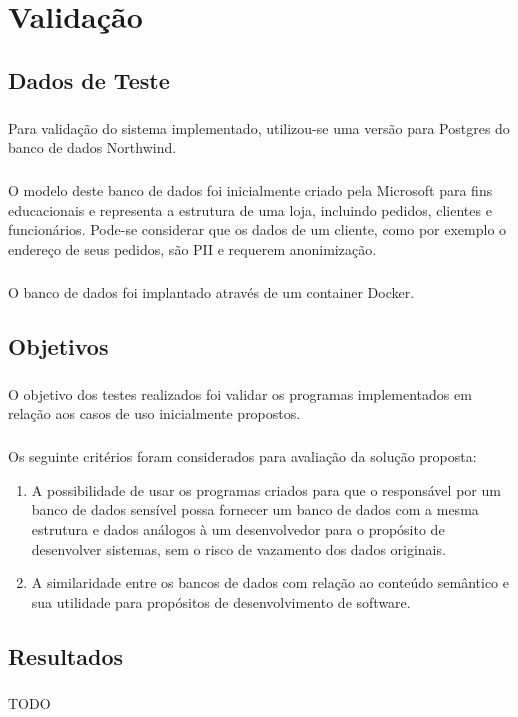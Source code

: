 \chapter{Validação}
\label{cap5}

\section{Dados de Teste}

\paragraph{} Para validação do sistema implementado, utilizou-se uma versão para Postgres do banco de dados Northwind\cite{northwindpg}.

\paragraph{} O modelo deste banco de dados foi inicialmente criado pela Microsoft para fins educacionais e representa a estrutura de uma loja, incluindo pedidos, clientes e funcionários. Pode-se considerar que os dados de um cliente, como por exemplo o endereço de seus pedidos, são PII e requerem anonimização.

\paragraph{} O banco de dados foi implantado através de um container Docker.

\section{Objetivos}

\paragraph{} O objetivo dos testes realizados foi validar os programas implementados em relação aos casos de uso inicialmente propostos.

\paragraph{} Os seguinte critérios foram considerados para avaliação da solução proposta:

\begin{enumerate}
    \item A possibilidade de usar os programas criados para que o responsável por um banco de dados sensível possa fornecer um banco de dados com a mesma estrutura e dados análogos à um desenvolvedor para o propósito de desenvolver sistemas, sem o risco de vazamento dos dados originais.
    \item A similaridade entre os bancos de dados com relação ao conteúdo semântico e sua utilidade para propósitos de desenvolvimento de software.
\end{enumerate}

\section{Resultados}

\paragraph{} TODO